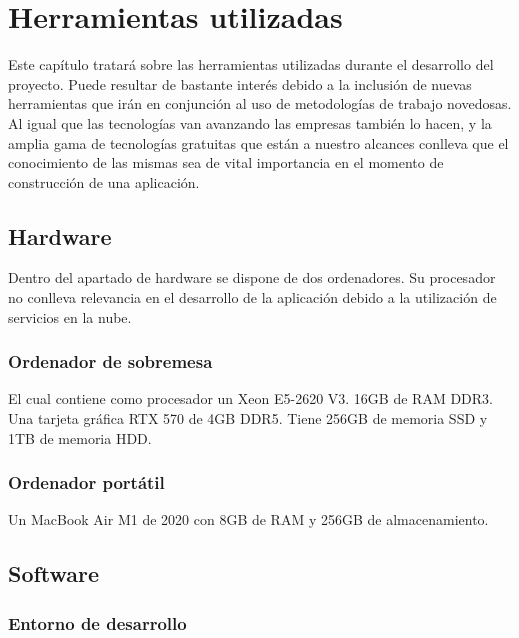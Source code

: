 \chapter{Herramientas utilizadas}

Este capítulo tratará sobre las herramientas utilizadas durante el desarrollo del proyecto. Puede resultar de bastante interés debido a la inclusión de nuevas herramientas que irán en conjunción al uso de metodologías de trabajo novedosas.
\\Al igual que las tecnologías van avanzando las empresas también lo hacen, y la amplia gama de tecnologías gratuitas que están a nuestro alcances conlleva que el conocimiento de las mismas sea de vital importancia en el momento de construcción de una aplicación.

\section{Hardware}

Dentro del apartado de hardware se dispone de dos ordenadores. Su procesador no conlleva relevancia en el desarrollo de la aplicación debido a la utilización de servicios en la nube.

\subsection{Ordenador de sobremesa}

El cual contiene como procesador un Xeon E5-2620 V3. 16GB de RAM DDR3. Una tarjeta gráfica RTX 570 de 4GB DDR5. Tiene 256GB de memoria SSD y 1TB de memoria HDD.

\subsection{Ordenador portátil}

Un MacBook Air M1 de 2020 con 8GB de RAM y 256GB de almacenamiento.

\section{Software}

\subsection{Entorno de desarrollo}

